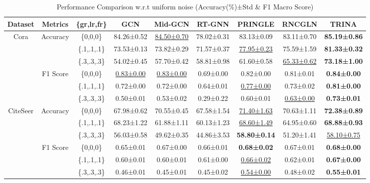 \documentclass[sigconf, anonymous, review]{acmart}
\begin{document}
      \begin{table}
        \centering
        \caption{Performance Comparison w.r.t uniform noise (Accuracy(\%)±Std \& F1 Macro Score)}        
        {\small
        \begin{tabular}{ccccccccc}
          \toprule
          Dataset&Metrics&\{gr,lr,fr\} & GCN & Mid-GCN & RT-GNN & PRINGLE & RNCGLN & TRINA\\
          \midrule
          \multirow{6}{*}{Cora}& \multirow{3}{*}{Accuracy}&\{0,0,0\}&84.26±0.52&\underline{84.50±0.70}&78.02±0.31&83.13±0.09&83.11±0.70&\textbf{85.19±0.86} \\
            &&\{.1,.1,.1\}&73.53±0.13&73.82±0.29&71.57±0.37&\underline{77.95±0.23}&75.59±1.59&\textbf{81.33±0.32}  \\
            &&\{.3,.3,.3\}&54.02±0.45&57.70±0.42&58.81±0.98&61.60±0.58&\underline{65.33±0.62}&\textbf{73.18±1.00 }\\
            
              & \multirow{3}{*}{F1 Score}&\{0,0,0\}&\underline{0.83±0.00}&\underline{0.83±0.00}&0.69±0.00&0.82±0.00&0.81±0.01&\textbf{0.84±0.00} \\
            &&\{.1,.1,.1\}&0.72±0.00&0.72±0.00&0.64±0.01&\underline{0.77±0.00}&0.73±0.02&\textbf{0.81±0.00} \\
            &&\{.3,.3,.3\}&0.50±0.01&0.53±0.02&0.29±0.22&0.60±0.01&\underline{0.63±0.00}&\textbf{0.73±0.01}\\
          
          \midrule
          \multirow{6}{*}{CiteSeer}& \multirow{3}{*}{Accuracy} &\{0,0,0\}&67.98±0.62&70.55±0.45&67.58±1.54&\underline{71.40±1.63}&70.63±1.11&\textbf{72.38±0.89} \\
            &&\{.1,.1,.1\}&68.23±1.22&61.88±1.11&60.13±1.23&\underline{68.60±1.49}&64.95±0.60&\textbf{68.88±0.93}\\
            &&\{.3,.3,.3\}&56.03±0.58&49.62±0.35&44.86±3.53&\textbf{58.80±0.14}&51.20±1.41&\underline{58.10±0.75}\\
            
              & \multirow{3}{*}{F1 Score}&\{0,0,0\}&0.65±0.01&0.67±0.00&0.66±0.01&\textbf{0.68±0.02}&0.67±0.01&\textbf{0.68±0.00} \\
            &&\{.1,.1,.1\}&0.60±0.01&0.60±0.01&0.61±0.00&\underline{0.66±0.02}&0.62±0.01&\textbf{0.67±0.00} \\
            &&\{.3,.3,.3\}&0.46±0.01&0.45±0.01&0.45±0.02&\underline{0.54±0.00}&0.48±0.02&\textbf{0.55±0.01}\\
            

\end{tabular}}
\end{table}
\end{document}

